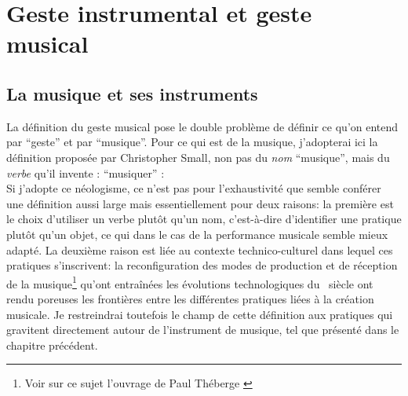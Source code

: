 
\section{Geste instrumental et geste musical}

\subsection{La musique et ses instruments}

\noindent La définition du geste musical pose le double problème de définir ce qu'on entend par ``geste'' et par ``musique''. Pour ce qui est de la musique, j'adopterai ici la définition proposée par Christopher Small, non pas du \textit{nom} ``musique'', mais du \textit{verbe} qu'il invente : ``musiquer'' \cite{small_musicking:_1998}:
\\
\indent Si j'adopte ce néologisme, ce n'est pas pour l'exhaustivité que semble conférer une définition aussi large mais essentiellement pour deux raisons: la première est le choix d'utiliser un verbe plutôt qu'un nom, c'est-à-dire d'identifier une pratique plutôt qu'un objet, ce qui dans le cas de la performance musicale semble mieux adapté. La deuxième raison est liée au contexte technico-culturel dans lequel ces pratiques s'inscrivent: la reconfiguration des modes de production et de réception de la musique\footnote{Voir sur ce sujet l'ouvrage de Paul Théberge \cite{theberge_any_1997}} qu'ont entraînées les évolutions technologiques du ~siècle ont rendu poreuses les frontières entre les différentes pratiques liées à la création musicale. Je restreindrai toutefois le champ de cette définition aux pratiques qui gravitent directement autour de l'instrument de musique, tel que présenté dans le chapitre précédent.\\
